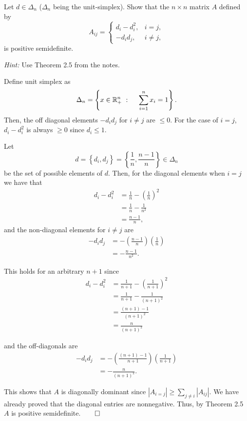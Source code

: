 \documentclass{article}
\begin{document}
    
	
	\begin{ex}
	Let $d \in \Delta_n$ ($\Delta_n$ being the unit-simplex). Show that the $n\times n$ matrix $A$ defined by 
	$$
	A_{ij} = \begin{cases}
	d_i - d_i^2, & i = j, \\
	-d_i d_j, & i \neq j,
	\end{cases}
	$$
	is positive semidefinite.
	
	\emph{Hint:} Use Theorem 2.5 from the notes.
	\end{ex}
	
	Define unit simplex as 
	\begin{equation*}
	   \Delta_n = \left\{ x \in \mathbb{R}^n_{+} \ : \ \quad \sum_{i=1}^n x_i = 1 \right\}.
	\end{equation*}
	Then, the off diagonal elements $-d_i d_j$ for $i \neq j$ are $\leq 0$. For the case of $i = j$, $d_i - d_i^2$ is always $\geq 0$ since $d_i \leq 1$. 
	
	Let 
	\begin{equation*}
	    d = \left\{d_i, d_j\right\} = \left\{ \frac{1}{n} , \frac{n-1}{n} \right\} \in \Delta_n
	\end{equation*} be the set of possible elements of $d$. Then, for the diagonal elements when $i = j$ we have that 
	\begin{align*}
	    d_i - d_i^2 &= \frac{1}{n} - \left(\frac{1}{n}\right)^2 \\
	    &= \frac{1}{n} - \frac{1}{n^2} \\
	    &= \frac{n-1}{n},
	\end{align*}
    and the non-diagonal elements for $i \neq j$ are 
    \begin{align*}
        -d_i d_j &= -\left(\frac{n-1}{n}\right) \left(\frac{1}{n}\right) \\
        &= -\frac{n-1}{n^2}. 
    \end{align*}
    
    This holds for an arbitrary $n+1$ since 
	\begin{align*}
	    d_i - d_i^2 &= \frac{1}{n+1} - \left(\frac{1}{n+1}\right)^2 \\
	    &= \frac{1}{n+1} - \frac{1}{\left(n+1\right)^2} \\
	    &= \frac{\left( n+1\right) - 1}{\left(n+1\right)^2} \\
	    &= \frac{n}{\left(n+1\right)^2}
	\end{align*}
	
    and the off-diagonals are  
    \begin{align*}
        -d_i d_j &= -\left(\frac{\left(n+1\right)-1}{n+1}\right) \left(\frac{1}{n+1}\right) \\
        &= -\frac{n}{\left(n+1\right)^2}.
    \end{align*}
    
    This shows that $A$ is diagonally dominant since $|A_{i=j}|\geq\sum_{j\neq i} |A_{ij}|$. We have already proved that the diagonal entries are nonnegative. Thus, by Theorem 2.5 $A$ is positive semidefinite.$\qed$ 
	
\end{document}
